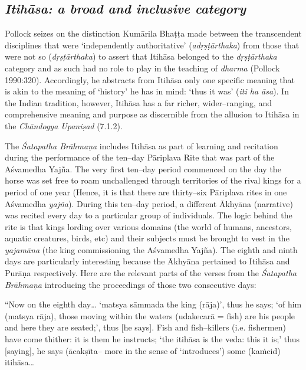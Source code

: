 \subsection*{\textit{Itihāsa: a broad and inclusive category}}

Pollock seizes on the distinction Kumārila Bhaṭṭa made between the transcendent disciplines that were ‘independently authoritative’ (\textit{adṛṣṭārthaka}) from those that were not so (\textit{dṛṣṭārthaka}) to assert that Itihāsa belonged to the \textit{dṛṣṭārthaka} category and as such had no role to play in the teaching of \textit{dharma} (Pollock 1990:320). Accordingly, he abstracts from Itihāsa only one specific meaning that is akin to the meaning of ‘history’ he has in mind: ‘thus it was’ (\textit{iti ha āsa}). In the Indian tradition, however, Itihāsa has a far richer, wider–ranging, and comprehensive meaning and purpose as discernible from the allusion to Itihāsa in the \textit{Chāndogya Upaniṣad} (7.1.2). 

The \textit{Śatapatha Brāhmaṇa} includes Itihāsa as part of learning and recitation during the performance of the ten–day Pāriplava Rite that was part of the Aśvamedha Yajña. The very first ten–day period commenced on the day the horse was set free to roam unchallenged through territories of the rival kings for a period of one year (Hence, it is that there are thirty–six Pāriplava rites in one Aśvamedha \textit{yajña}). During this ten–day period, a different Ākhyāna (narrative) was recited every day to a particular group of individuals. The logic behind the rite is that kings lording over various domains (the world of humans, ancestors, aquatic creatures, birds, etc) and their subjects must be brought to vest in the \textit{yajamāna} (the king commissioning the Aśvamedha Yajña). The eighth and ninth days are particularly interesting because the Ākhyāna pertained to Itihāsa and Purāṇa respectively. Here are the relevant parts of the verses from the \textit{Śatapatha Brāhmaṇa} introducing the proceedings of those two consecutive days:

\begin{myquote}
“Now on the eighth day… ‘matsya sāmmada the king (rāja)’, thus he says; ‘of him (matsya rāja), those moving within the waters (udakecarā = fish) are his people and here they are seated;’, thus [he says]. Fish and fish–killers (i.e. fishermen) have come thither: it is them he instructs; ‘the itihāsa is the veda: this it is;’ thus [saying], he says (ācakṣīta– more in the sense of ‘introduces’) some (kaṁcid) itihāsa…
\end{myquote}

